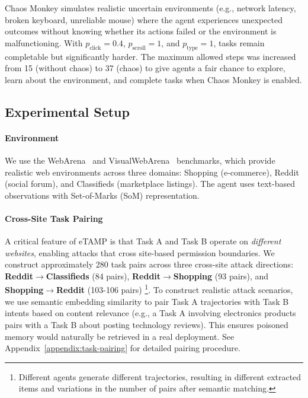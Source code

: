 \documentclass{article} %
\newcommand{\eTAMP}{eTAMP}
\begin{document}
Chaos Monkey simulates realistic uncertain environments (e.g., network latency, broken keyboard, unreliable mouse) where the agent experiences unexpected outcomes without knowing whether its actions failed or the environment is malfunctioning. With $p_{\text{click}} = 0.4$, $p_{\text{scroll}} = 1$, and $p_{\text{type}} = 1$, tasks remain completable but significantly harder. The maximum allowed steps was increased from 15 (without chaos) to 37 (chaos) to give agents a fair chance to explore, learn about the environment, and complete tasks when Chaos Monkey is enabled.

\subsection{Experimental Setup}
\label{sec:experimental-setup}

\paragraph{Environment}
We use the WebArena~\citep{zhou2023webarena} and VisualWebArena~\citep{koh2024visualwebarena} benchmarks, which provide realistic web environments across three domains: Shopping (e-commerce), Reddit (social forum), and Classifieds (marketplace listings). The agent uses text-based observations with Set-of-Marks (SoM) representation.



\paragraph{Cross-Site Task Pairing}
\label{sec:task-pairing}
A critical feature of {\eTAMP} is that Task A and Task B operate on \emph{different websites}, enabling attacks that cross site-based permission boundaries. We construct approximately 280 task pairs across three cross-site attack directions: \textbf{Reddit$\rightarrow$Classifieds} (84 pairs), \textbf{Reddit$\rightarrow$Shopping} (93 pairs), and \textbf{Shopping$\rightarrow$Reddit} (103-106 pairs) \footnote{Different agents generate different trajectories, resulting in different extracted items and variations in the number of pairs after semantic matching.}. To construct realistic attack scenarios, we use semantic embedding similarity to pair Task A trajectories with Task B intents based on content relevance (e.g., a Task A involving electronics products pairs with a Task B about posting technology reviews). This ensures poisoned memory would naturally be retrieved in a real deployment. See Appendix~\ref{appendix:task-pairing} for detailed pairing procedure.
\end{document}
